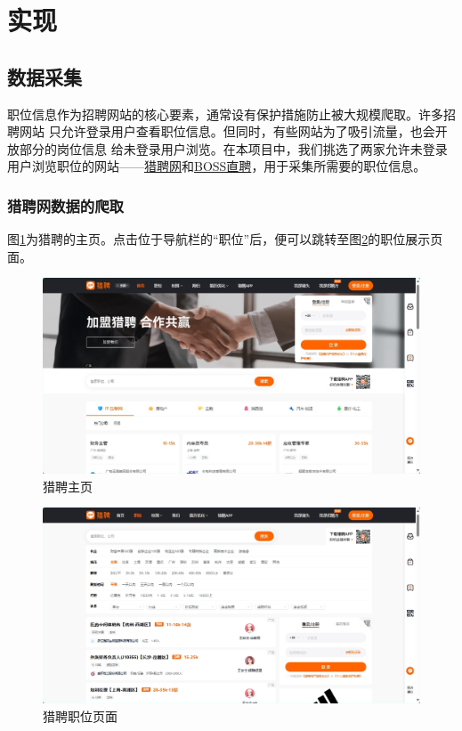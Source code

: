 \section{实现}
\subsection{数据采集}
职位信息作为招聘网站的核心要素，通常设有保护措施防止被大规模爬取。许多招聘网站
只允许登录用户查看职位信息。但同时，有些网站为了吸引流量，也会开放部分的岗位信息
给未登录用户浏览。在本项目中，我们挑选了两家允许未登录用户浏览职位的网站——\href{liepin.com}{猎聘网}和\href{zhipin.com}{BOSS直聘}，用于采集所需要的职位信息。

\subsubsection{猎聘网数据的爬取}
图\ref{liepin}为猎聘的主页。点击位于导航栏的“职位”后，便可以跳转至图\ref{liepinJob}的职位展示页面。

\begin{figure}[!htbp]
    \centering
    \includegraphics[width=\textwidth]{figures/liepin.png}
    \caption{猎聘主页}\label{liepin}
\end{figure}

\begin{figure}[!htbp]
    \centering
    \includegraphics[width=\textwidth]{figures/liepinJob.png}
    \caption{猎聘职位页面}\label{liepinJob}
\end{figure}



